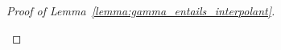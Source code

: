 \begin{proof}[Proof of Lemma~\ref{lemma:gamma_entails_interpolant}]
\begin{description}
\begin{comment}
			to show:
			$\Gamma \entails \lifdelta{ [ (( s=t \land \PI(C_2) ) \lor (s\neq t \land \PI(C_1))) \lor (D \lor E[t]) ]\sigma} $

			proof idea: either $s=t$, then also $\PI(C_2)$, or else $s\neq t$, but then also $\PI(C_1)$

			by lemma \ref{lemma:lif} for $\sigma'$ as in lemma, 
			$\Gamma \entails \lifdelta{ (( s=t \land \PI(C_2) ) \lor (s\neq t \land \PI(C_1))) \lor (D \lor E[t]) }\sigma' $

			by lemma 11 (huang)
			$\Gamma \entails [((\lifdelta{s}=\lifdelta{t} \land \lifdelta{\PI(C_2)} ) \lor (\lifdelta{s\neq t} \land \lifdelta{\PI(C_1)})) \lor (\lifdelta{D} \lor \lifdelta{E[t]}) ]\sigma' $

			reformulate:
			$\Gamma \entails ((\lifdelta{s}\sigma'=\lifdelta{t}\sigma' \land \lifdelta{\PI(C_2)}\sigma' ) \lor (\lifdelta{s}\sigma'\neq \lifdelta{t}\sigma' \land \lifdelta{\PI(C_1)}\sigma')) \lor (\lifdelta{D}\sigma' \lor \lifdelta{E[t]}\sigma') $

			By the rule: $s\sigma = r\sigma$, hence also $\lifdelta{s\sigma} = \lifdelta{r\sigma}$ and $\lifdelta{s}\sigma' = \lifdelta{r}\sigma'$ REALLY TRUE? -- think so\dots

			Suppose $M \entails \Gamma$ and $M \not \entails (\lifdelta{D}\sigma' \lor \lifdelta{E[t]}\sigma') $.

			Suppose $M \entails \lifdelta{s}\sigma' = \lifdelta{t}\sigma'$.

			By induction hypothesis (and lemma 11 (huang) and adding the substitution $\sigma'$), 
			$\Gamma \entails \lifdelta{\PI(C_2)}\sigma' \lor \lifdelta{(E[r])}\sigma'$.

			However by assumption $\Gamma \not \entails \lifdelta{E[t]}\sigma'$.

			Hence $\Gamma \not \entails \lifdelta{E[s]}\sigma'$, and
			$\Gamma \not \entails \lifdelta{E[r]}\sigma'$. Therefore $\Gamma \entails \lifdelta{\PI(C_2)}\sigma'$.


			Suppose on the other hand $M \entails \lifdelta{s}\sigma' \neq \lifdelta{t}\sigma'$.

			By the induction hypothesis, 
			$M \entails \lifdelta{\PI(C_1)}\sigma' \lor (\lifdelta{D}\sigma'\lor (\lifdelta{s}=\lifdelta{t})\sigma')$,
			hence then $M \entails \lifdelta{\PI(C_1)}\sigma'$.

			Consequently, 
			$M \entails (\lifdelta{s}\sigma' \neq \lifdelta{t}\sigma' \land \lifdelta{\PI(C_1)}\sigma') \lor (\lifdelta{s}\sigma' = \lifdelta{t}\sigma' \land \lifdelta{\PI(C_2)}\sigma')$.

			By lemma 11 (huang), 
			$M \entails \lifdelta{s \neq {t} \land {\PI(C_1)} \lor ({s} = {t} \land \PI(C_2))}\sigma'$.

			Hence 
			$\Gamma \entails \lifdelta{(s \neq {t} \land {\PI(C_1)} \lor ({s} = {t} \land \PI(C_2))}\sigma' \lor (\lifdelta{D} \lor \lifdelta{E[t]})\sigma') $.

			is this really what i need to show?
		\end{comment}
\end{description}
\end{proof}
